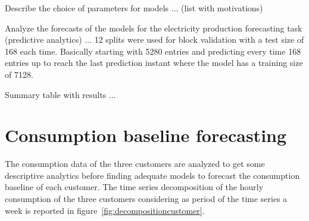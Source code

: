 Describe the choice of parameters for models ... (list with motivations)

Analyze the forecasts of the models for the electricity production forecasting task (predictive analytics) ...
12 splits were used for block validation with a test size of 168 each time.
Basically starting with 5280 entries and predicting every time 168 entries up to reach the last prediction instant where the model has a training size of 7128. %

Summary table with results ...


\section{Consumption baseline forecasting} 
\label{sec:baselineval}
\vspace{0.2 cm}

The consumption data of the three customers are analyzed to get some descriptive analytics before finding adequate models to forecast the consumption baseline of each customer.
The time series decomposition of the hourly consumption of the three customers considering as period of the time series a week is reported in figure~\ref{fig:decompositioncustomer}. %

